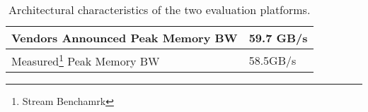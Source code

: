 \documentclass[twoside]{article}
\begin{document}
\begin{multicols}{2}
\begin{table}[H]
\begin{tabular}{ | L{3.5cm} | R{5cm} | }
    Vendors Announced Peak Memory BW & 59.7 GB/s\\ \hline
    Measured\footnote{Stream Benchamrk} Peak Memory BW & 58.5GB/s\\ \hline
  \end{tabular}
     \caption{Architectural characteristics of the two evaluation platforms.}
     \label{table:characterization}
\end{table}





\end{multicols}
\end{document}

